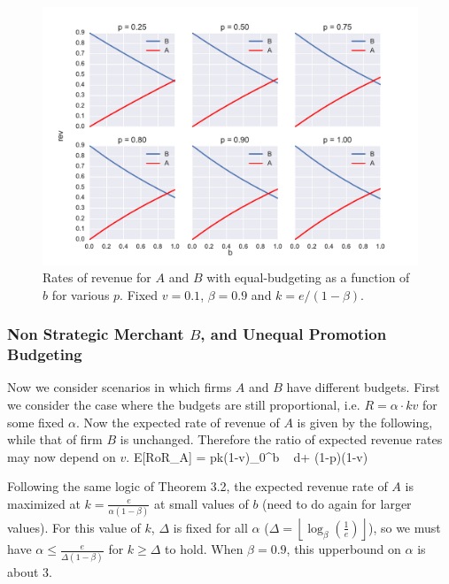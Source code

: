 \begin{figure}[h!]
\begin{centering}
\includegraphics[scale = 0.75]{./figures/eq_budg_vary_p_v01.pdf}
\caption{Rates of revenue for $A$ and $B$ with equal-budgeting as a function of $b$ for various $p$. Fixed $v = 0.1$, $\beta = 0.9$ and $k = e/(1-\beta)$.}
\label{fig:eq_budg_vary_p}
\end{centering}
\end{figure}

\subsubsection{Non Strategic Merchant $B$, and Unequal Promotion Budgeting}

Now we consider scenarios in which firms $A$ and $B$ have different budgets. First we consider the case where the budgets are still proportional, i.e. $R = \alpha \cdot kv$ for some fixed $\alpha$. Now the expected rate of revenue of $A$ is given by the following, while that of firm $B$ is unchanged. Therefore the ratio of expected revenue rates may now depend on $v$.
\beq
{}E[RoR_A] = pk(1-\alpha v)\int_0^b  \mbox{ } d\lambda + (1-p)(1-\alpha v)
\eeq

Following the same logic of Theorem 3.2, the expected revenue rate of $A$ is maximized at $k = \frac{e}{\alpha(1-\beta)}$ at small values of $b$ (need to do again for larger values). For this value of $k$, $\Delta$ is fixed for all $\alpha$ ($\Delta = \left \lfloor \log_{\beta} \left(\frac{1}{e} \right) \right \rfloor$), so we must have $\alpha \leq \frac{e}{\Delta(1-\beta)}$ for $k \geq \Delta$ to hold. When $\beta = 0.9$, this upperbound on $\alpha$ is about 3.


